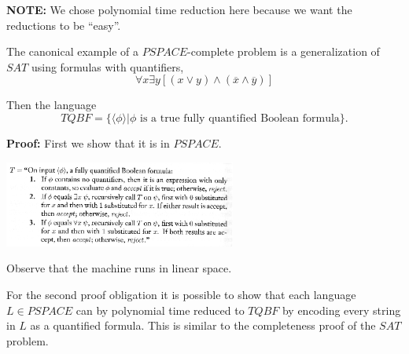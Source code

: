 \documentclass[a4paper,blends,pdf,colorBG,slideColor]{prosper}
\begin{document}


\vspace{.2in}
{\bf NOTE:} We chose polynomial time reduction here because we want the reductions to be ``easy''.
\es

The canonical example of a $PSPACE$-complete problem is a generalization of $SAT$ using
formulas with quantifiers,
\[
\forall x \exists y [ (x \vee y) \wedge ( \overline{x} \wedge \overline{y})]
\]

Then the language
\[
TQBF = \{\langle \phi \rangle | \text{$\phi$ is a true fully quantified Boolean formula}\}.
\]

\es

\small
{}

{\bf Proof:}  First we show that it is in $PSPACE$.

\includegraphics[width=3in]{images/tqbf.eps}

Observe that the machine runs in linear space.

For the second proof obligation it is possible to show that each language $L \in PSPACE$ can
by polynomial time reduced to $TQBF$ by encoding every string in $L$ as a quantified formula.
This is similar to the completeness proof of the $SAT$ problem.
\es

\vspace{.2in}
\es
\end{document}
